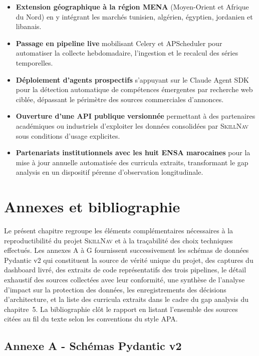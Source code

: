 \documentclass[11pt,a4paper,openany]{report}
\newcommand{\skillnav}{\textsc{SkillNav}\xspace}
\begin{document}
\begin{itemize}
  \item \textbf{Extension g\'eographique \`a la r\'egion MENA} (Moyen-Orient et Afrique du Nord) en y int\'egrant les march\'es tunisien, alg\'erien, \'egyptien, jordanien et libanais.
  \item \textbf{Passage en pipeline live} mobilisant Celery et APScheduler pour automatiser la collecte hebdomadaire, l'ingestion et le recalcul des s\'eries temporelles.
  \item \textbf{D\'eploiement d'agents prospectifs} s'appuyant sur le Claude Agent SDK pour la d\'etection automatique de comp\'etences \'emergentes par recherche web cibl\'ee, d\'epassant le p\'erim\`etre des sources commerciales d'annonces.
  \item \textbf{Ouverture d'une API publique versionn\'ee} permettant \`a des partenaires acad\'emiques ou industriels d'exploiter les donn\'ees consolid\'ees par \skillnav sous conditions d'usage explicites.
  \item \textbf{Partenariats institutionnels avec les huit ENSA marocaines} pour la mise \`a jour annuelle automatis\'ee des curricula extraits, transformant le gap analysis en un dispositif p\'erenne d'observation longitudinale.
\end{itemize}

\chapter{Annexes et bibliographie}

Le pr\'esent chapitre regroupe les \'el\'ements compl\'ementaires n\'ecessaires \`a la reproductibilit\'e du projet \skillnav et \`a la tra\c{c}abilit\'e des choix techniques effectu\'es. Les annexes A \`a G fournissent successivement les sch\'emas de donn\'ees Pydantic v2 qui constituent la source de v\'erit\'e unique du projet, des captures du dashboard livr\'e, des extraits de code repr\'esentatifs des trois pipelines, le d\'etail exhaustif des sources collect\'ees avec leur conformit\'e, une synth\`ese de l'analyse d'impact sur la protection des donn\'ees, les enregistrements des d\'ecisions d'architecture, et la liste des curricula extraits dans le cadre du gap analysis du chapitre~5. La bibliographie cl\^ot le rapport en listant l'ensemble des sources cit\'ees au fil du texte selon les conventions du style APA.

\section*{Annexe A - Sch\'emas Pydantic v2}
\end{document}
